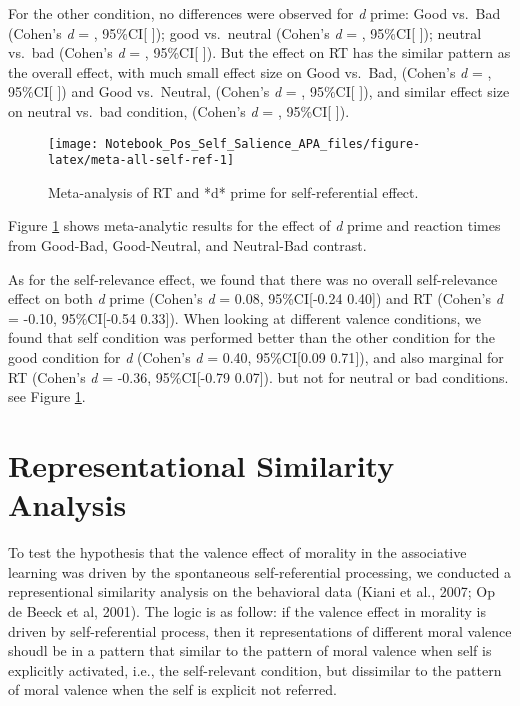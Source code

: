 \documentclass[man]{apa6}
\begin{document}
For the other condition, no differences were observed for \emph{d} prime: Good vs.~Bad (Cohen's \emph{d} = , 95\%CI{[} {]}); good vs.~neutral (Cohen's \emph{d} = , 95\%CI{[} {]}); neutral vs.~bad (Cohen's \emph{d} = , 95\%CI{[} {]}). But the effect on RT has the similar pattern as the overall effect, with much small effect size on Good vs.~Bad, (Cohen's \emph{d} = , 95\%CI{[} {]}) and Good vs.~Neutral, (Cohen's \emph{d} = , 95\%CI{[} {]}), and similar effect size on neutral vs.~bad condition, (Cohen's \emph{d} = , 95\%CI{[} {]}).

\begin{figure}

{\centering \texttt{[image: Notebook\_Pos\_Self\_Salience\_APA\_files/figure-latex/meta-all-self-ref-1]} 

}

\caption{Meta-analysis of RT and *d* prime for self-referential effect.}\label{fig:meta-all-self-ref}
\end{figure}

Figure \ref{fig:meta-all-self-ref} shows meta-analytic results for the effect of \emph{d} prime and reaction times from Good-Bad, Good-Neutral, and Neutral-Bad contrast.

As for the self-relevance effect, we found that there was no overall self-relevance effect on both \emph{d} prime (Cohen's \emph{d} = 0.08, 95\%CI{[}-0.24 0.40{]}) and RT (Cohen's \emph{d} = -0.10, 95\%CI{[}-0.54 0.33{]}). When looking at different valence conditions, we found that self condition was performed better than the other condition for the good condition for \emph{d} (Cohen's \emph{d} = 0.40, 95\%CI{[}0.09 0.71{]}), and also marginal for RT (Cohen's \emph{d} = -0.36, 95\%CI{[}-0.79 0.07{]}). but not for neutral or bad conditions. see Figure \ref{fig:meta-all-self-ref}.

\hypertarget{representational-similarity-analysis}{%
\section{Representational Similarity Analysis}\label{representational-similarity-analysis}}

To test the hypothesis that the valence effect of morality in the associative learning was driven by the spontaneous self-referential processing, we conducted a representional similarity analysis on the behavioral data (Kiani et al., 2007; Op de Beeck et al, 2001). The logic is as follow: if the valence effect in morality is driven by self-referential process, then it representations of different moral valence shoudl be in a pattern that similar to the pattern of moral valence when self is explicitly activated, i.e., the self-relevant condition, but dissimilar to the pattern of moral valence when the self is explicit not referred.
\end{document}
